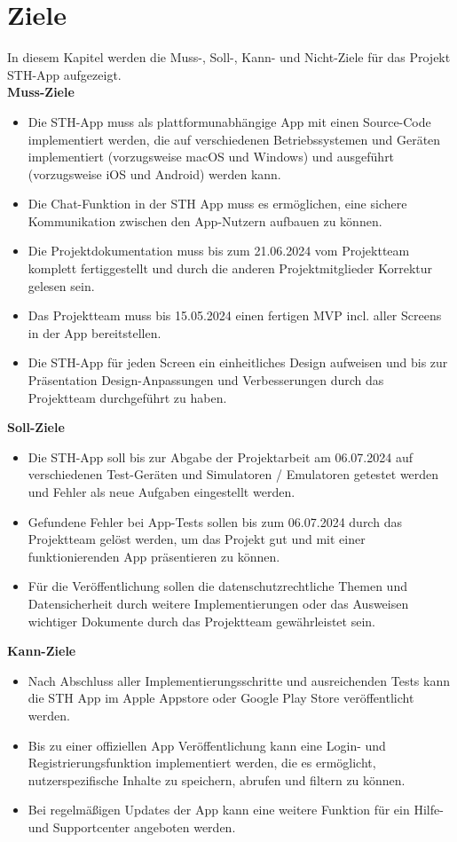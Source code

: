 \chapter{Ziele}
In diesem Kapitel werden die Muss-, Soll-, Kann- und Nicht-Ziele für das Projekt STH-App aufgezeigt.
\\

\textbf{Muss-Ziele}
\begin{itemize}
    \item Die STH-App muss als plattformunabhängige App mit einen Source-Code implementiert werden, die auf verschiedenen Betriebssystemen und Geräten implementiert (vorzugsweise macOS und Windows) und ausgeführt (vorzugsweise iOS und Android) werden kann.
    \item Die Chat-Funktion in der STH App muss es ermöglichen, eine sichere Kommunikation zwischen den App-Nutzern aufbauen zu können.
    \item Die Projektdokumentation muss bis zum 21.06.2024 vom Projektteam komplett fertiggestellt und durch die anderen Projektmitglieder Korrektur gelesen sein.
    \item Das Projektteam muss bis 15.05.2024 einen fertigen MVP incl. aller Screens in der App bereitstellen.
    \item Die STH-App für jeden Screen ein einheitliches Design aufweisen und bis zur Präsentation Design-Anpassungen und Verbesserungen durch das Projektteam durchgeführt zu haben.
\end{itemize}

\textbf{Soll-Ziele}
\begin{itemize}
    \item Die STH-App soll bis zur Abgabe der Projektarbeit am 06.07.2024 auf verschiedenen Test-Geräten und Simulatoren / Emulatoren getestet werden und Fehler als neue Aufgaben eingestellt werden.
    \item Gefundene Fehler bei App-Tests sollen bis zum 06.07.2024 durch das Projektteam gelöst werden, um das Projekt gut und mit einer funktionierenden App präsentieren zu können.
    \item Für die Veröffentlichung sollen die datenschutzrechtliche Themen und Datensicherheit durch weitere Implementierungen oder das Ausweisen wichtiger Dokumente durch das Projektteam gewährleistet sein.
\end{itemize}

\textbf{Kann-Ziele}
\begin{itemize}
    \item Nach Abschluss aller Implementierungsschritte und ausreichenden Tests kann die STH App im Apple Appstore oder Google Play Store veröffentlicht werden.
    \item Bis zu einer offiziellen App Veröffentlichung kann eine Login- und Registrierungsfunktion implementiert werden, die es ermöglicht, nutzerspezifische Inhalte zu speichern, abrufen und filtern zu können.
    \item Bei regelmäßigen Updates der App kann eine weitere Funktion für ein Hilfe- und Supportcenter angeboten werden.
\end{itemize}

